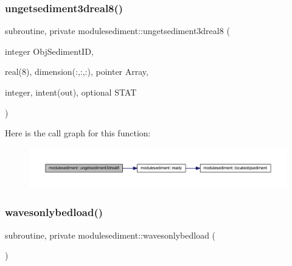 \subsubsection{\texorpdfstring{ungetsediment3dreal8()}{ungetsediment3dreal8()}}
{\footnotesize\ttfamily subroutine, private modulesediment\+::ungetsediment3dreal8 (\begin{DoxyParamCaption}\item[{integer}]{Obj\+Sediment\+ID,  }\item[{real(8), dimension(\+:,\+:,\+:), pointer}]{Array,  }\item[{integer, intent(out), optional}]{S\+T\+AT }\end{DoxyParamCaption})\hspace{0.3cm}{\ttfamily [private]}}

Here is the call graph for this function\+:\nopagebreak
\begin{figure}[H]
\begin{center}
\leavevmode
\includegraphics[width=350pt]{namespacemodulesediment_abf1b5c58352a7fda2565c80929e6e099_cgraph}
\end{center}
\end{figure}
\mbox{\label{namespacemodulesediment_ab75ac0182e2b11a8063dbb8027fa8d19}} 
\subsubsection{\texorpdfstring{wavesonlybedload()}{wavesonlybedload()}}
{\footnotesize\ttfamily subroutine, private modulesediment\+::wavesonlybedload (\begin{DoxyParamCaption}{ }\end{DoxyParamCaption})\hspace{0.3cm}{\ttfamily [private]}}

